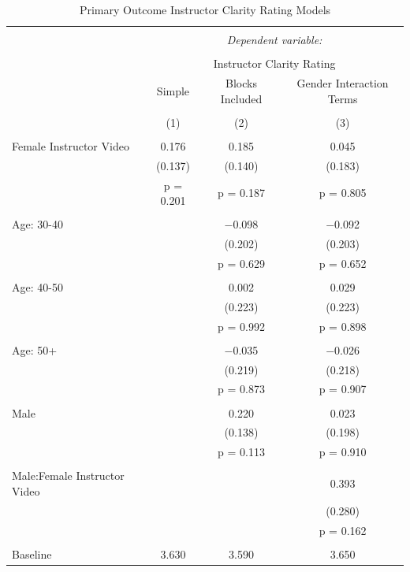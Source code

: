 \documentclass[
]{article}
\begin{document}
\begin{table}[!htbp] \centering 
  \caption{Primary Outcome Instructor Clarity Rating Models} 
  \label{} 
\small 
\begin{tabular}{@{\extracolsep{3pt}}lccc} 
\\[-1.8ex]\hline 
\hline \\[-1.8ex] 
 & \multicolumn{3}{c}{\textit{Dependent variable:}} \\ 
\cline{2-4} 
\\[-1.8ex] & \multicolumn{3}{c}{Instructor Clarity Rating} \\ 
 & Simple & Blocks Included & Gender Interaction Terms \\ 
\\[-1.8ex] & (1) & (2) & (3)\\ 
\hline \\[-1.8ex] 
 Female Instructor Video & 0.176 & 0.185 & 0.045 \\ 
  & (0.137) & (0.140) & (0.183) \\ 
  & p = 0.201 & p = 0.187 & p = 0.805 \\ 
  & & & \\ 
 Age: 30-40 &  & $-$0.098 & $-$0.092 \\ 
  &  & (0.202) & (0.203) \\ 
  &  & p = 0.629 & p = 0.652 \\ 
  & & & \\ 
 Age: 40-50 &  & 0.002 & 0.029 \\ 
  &  & (0.223) & (0.223) \\ 
  &  & p = 0.992 & p = 0.898 \\ 
  & & & \\ 
 Age: 50+ &  & $-$0.035 & $-$0.026 \\ 
  &  & (0.219) & (0.218) \\ 
  &  & p = 0.873 & p = 0.907 \\ 
  & & & \\ 
 Male &  & 0.220 & 0.023 \\ 
  &  & (0.138) & (0.198) \\ 
  &  & p = 0.113 & p = 0.910 \\ 
  & & & \\ 
 Male:Female Instructor Video &  &  & 0.393 \\ 
  &  &  & (0.280) \\ 
  &  &  & p = 0.162 \\ 
  & & & \\ 
 Baseline & 3.630 & 3.590 & 3.650 \\ 

\end{tabular}
\end{table}
\end{document}
